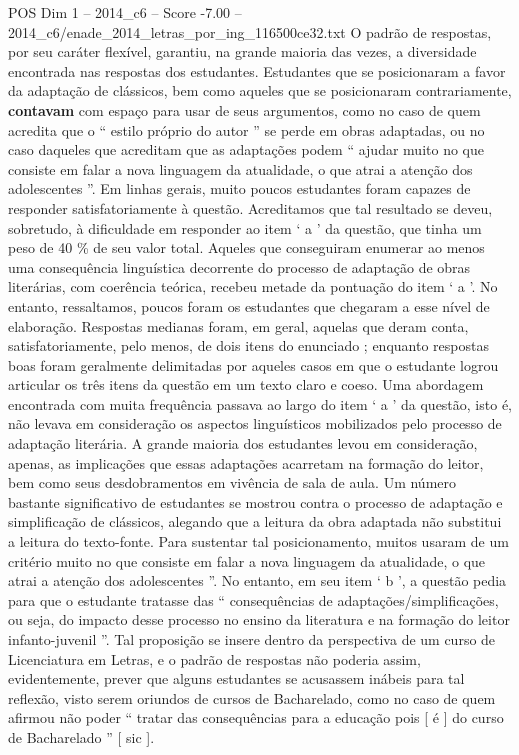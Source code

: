 \begin{textsample}{POS Dim 1 – 2014\_c6 – Score -7.00 – 2014\_c6/enade\_2014\_letras\_por\_ing\_116500ce32.txt}
O padrão de respostas, por seu caráter flexível, garantiu, na grande maioria das vezes, a diversidade encontrada nas respostas dos estudantes.
Estudantes que se posicionaram a favor da adaptação de clássicos, bem como aqueles que se posicionaram contrariamente, \textbf{contavam} com espaço para usar de seus argumentos, como no caso de quem acredita que o “ estilo próprio do autor ” se perde em obras adaptadas, ou no caso daqueles que acreditam que as adaptações podem “ ajudar muito no que consiste em falar a nova linguagem da atualidade, o que atrai a atenção dos adolescentes ”.
Em linhas gerais, muito poucos estudantes foram capazes de responder satisfatoriamente à questão.
Acreditamos que tal resultado se deveu, sobretudo, à dificuldade em responder ao item ‘ a ’ da questão, que tinha um peso de 40 \% de seu valor total.
Aqueles que conseguiram enumerar ao menos uma consequência linguística decorrente do processo de adaptação de obras literárias, com coerência teórica, recebeu metade da pontuação do item ‘ a ’.
No entanto, ressaltamos, poucos foram os estudantes que chegaram a esse nível de elaboração.
Respostas medianas foram, em geral, aquelas que deram conta, satisfatoriamente, pelo menos, de dois itens do enunciado ; enquanto respostas boas foram geralmente delimitadas por aqueles casos em que o estudante logrou articular os três itens da questão em um texto claro e coeso.
Uma abordagem encontrada com muita frequência passava ao largo do item ‘ a ’ da questão, isto é, não levava em consideração os aspectos linguísticos mobilizados pelo processo de adaptação literária.
A grande maioria dos estudantes levou em consideração, apenas, as implicações que essas adaptações acarretam na formação do leitor, bem como seus desdobramentos em vivência de sala de aula.
Um número bastante significativo de estudantes se mostrou contra o processo de adaptação e simplificação de clássicos, alegando que a leitura da obra adaptada não substitui a leitura do texto-fonte.
Para sustentar tal posicionamento, muitos usaram de um critério muito no que consiste em falar a nova linguagem da atualidade, o que atrai a atenção dos adolescentes ”.
No entanto, em seu item ‘ b ’, a questão pedia para que o estudante tratasse das “ consequências de adaptações/simplificações, ou seja, do impacto desse processo no ensino da literatura e na formação do leitor infanto-juvenil ”.
Tal proposição se insere dentro da perspectiva de um curso de Licenciatura em Letras, e o padrão de respostas não poderia assim, evidentemente, prever que alguns estudantes se acusassem inábeis para tal reflexão, visto serem oriundos de cursos de Bacharelado, como no caso de quem afirmou não poder “ tratar das consequências para a educação pois [ é ] do curso de Bacharelado ” [ sic ].

\end{textsample}

